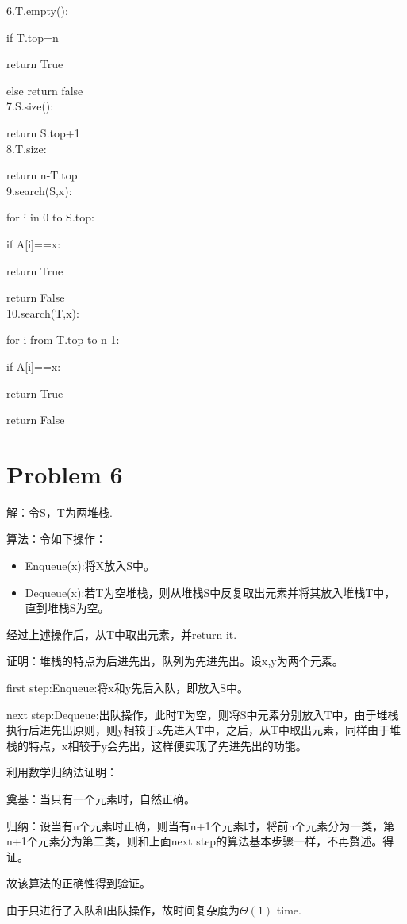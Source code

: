 \documentclass[12pt,a4paper]{article}
\begin{document}
6.T.empty():
\par\setlength\parindent{2em}if T.top=n
\par\setlength\parindent{4em}return True
\par\setlength\parindent{2em}else return false\\
7.S.size():
\par\setlength\parindent{2em}return S.top+1\\
8.T.size:
\par\setlength\parindent{2em}return n-T.top\\
9.search(S,x):
\par\setlength\parindent{2em}for i in 0 to S.top:
\par\setlength\parindent{2em}if A[i]==x:
\par\setlength\parindent{4em}return True
\par\setlength\parindent{2em}return False\\
10.search(T,x):
\par\setlength\parindent{2em}for i from T.top to n-1:
\par\setlength\parindent{2em}if A[i]==x:
\par\setlength\parindent{4em}return True
\par\setlength\parindent{2em}return False
\section{Problem 6}
解：令S，T为两堆栈.

算法：令如下操作：
\begin{itemize}
	\item Enqueue(x):将X放入S中。
	\item Dequeue(x):若T为空堆栈，则从堆栈S中反复取出元素并将其放入堆栈T中，直到堆栈S为空。
\end{itemize}
经过上述操作后，从T中取出元素，并return it.\par
证明：堆栈的特点为后进先出，队列为先进先出。设x,y为两个元素。\par
first step:Enqueue:将x和y先后入队，即放入S中。\par
next step:Dequeue:出队操作，此时T为空，则将S中元素分别放入T中，由于堆栈执行后进先出原则，则y相较于x先进入T中，之后，从T中取出元素，同样由于堆栈的特点，x相较于y会先出，这样便实现了先进先出的功能。\par
利用数学归纳法证明：\par
奠基：当只有一个元素时，自然正确。\par
归纳：设当有n个元素时正确，则当有n+1个元素时，将前n个元素分为一类，第n+1个元素分为第二类，则和上面next step的算法基本步骤一样，不再赘述。得证。\par
故该算法的正确性得到验证。\par
由于只进行了入队和出队操作，故时间复杂度为$\Theta(1)$ time.
\end{document}
